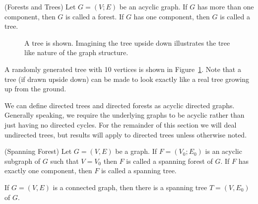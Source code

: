 %
\begin{definition}{ (Forests and Trees)}
Let \(G = (V;E)\) be an acyclic graph.
If \(G\) has more than one component, then \(G\) is called a forest.
If \(G\) has one component, then \(G\) is called a tree.
\end{definition}
%
\begin{figure}
\centering

\caption{\label{fig:g8}%
A tree is shown.
Imagining the tree upside down illustrates the tree like nature of the graph structure.
}
\end{figure}
%
\begin{example}
A randomly generated tree with 10 vertices is shown in Figure~\ref{fig:g8}.
Note that a tree (if drawn upside down) can be made to look exactly like a real tree growing up from the ground.
\end{example}
%
\begin{remark}
We can define directed trees and directed forests as acyclic directed graphs.
Generally speaking, we require the underlying graphs to be acyclic rather than just having no directed cycles.
For the remainder of this section we will deal undirected trees, but results will apply to directed trees unless otherwise noted.
\end{remark}
%
\begin{definition}{ (Spanning Forest)}
Let \(G = (V,E)\) be a graph.
If \(F = (V_0;E_0)\) is an acyclic subgraph of \(G\) such that \(V = V_0\) then \(F\) is called a spanning forest of \(G\).
If \(F\) has exactly one component, then \(F\) is called a spanning tree.
\end{definition}

\begin{theorem}
If \(G = (V,E)\) is a connected graph, then there is a spanning tree \(T =(V,E_0)\) of \(G\).
\end{theorem}

